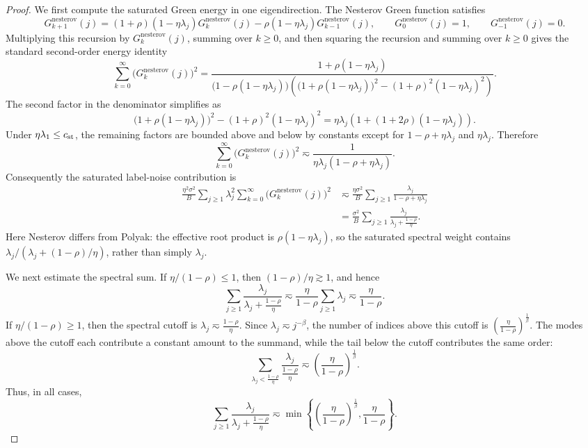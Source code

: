\documentclass[11pt]{article}
\newcommand{\nesterov}{\mathrm{nesterov}}
\begin{document}
\begin{proof}
We first compute the saturated Green energy in one eigendirection.  The Nesterov Green function satisfies
\[
    G_{k+1}^{\nesterov}(j)
    =
    (1+\rho)(1-\eta\lambda_j)G_k^{\nesterov}(j)
    -\rho(1-\eta\lambda_j)G_{k-1}^{\nesterov}(j),
    \qquad
    G_0^{\nesterov}(j)=1,
    \qquad
    G_{-1}^{\nesterov}(j)=0.
\]
Multiplying this recursion by \(G_k^{\nesterov}(j)\), summing over \(k\ge0\), and then squaring the
recursion and summing over \(k\ge0\) gives the standard second-order energy identity
\[
    \sum_{k=0}^{\infty}\bigl(G_k^{\nesterov}(j)\bigr)^2
    =
    \frac{1+\rho(1-\eta\lambda_j)}
    {\bigl(1-\rho(1-\eta\lambda_j)\bigr)
    \left(\bigl(1+\rho(1-\eta\lambda_j)\bigr)^2
    -(1+\rho)^2(1-\eta\lambda_j)^2\right)}.
\]
The second factor in the denominator simplifies as
\[
    \bigl(1+\rho(1-\eta\lambda_j)\bigr)^2
    -(1+\rho)^2(1-\eta\lambda_j)^2
    =
    \eta\lambda_j\left(1+(1+2\rho)(1-\eta\lambda_j)\right).
\]
Under \(\eta\lambda_1\le c_{\rm st}\), the remaining factors are bounded above and below by constants
except for \(1-\rho+\eta\lambda_j\) and \(\eta\lambda_j\).  Therefore
\[
    \sum_{k=0}^{\infty}\bigl(G_k^{\nesterov}(j)\bigr)^2
    \eqsim
    \frac{1}{\eta\lambda_j(1-\rho+\eta\lambda_j)}.
\]
Consequently the saturated label-noise contribution is
\[
\begin{aligned}
    \frac{\eta^2\sigma^2}{B}
    \sum_{j\ge1}\lambda_j^2
    \sum_{k=0}^{\infty}\bigl(G_k^{\nesterov}(j)\bigr)^2
    &\eqsim
    \frac{\eta\sigma^2}{B}
    \sum_{j\ge1}\frac{\lambda_j}{1-\rho+\eta\lambda_j}  \\
    &=
    \frac{\sigma^2}{B}
    \sum_{j\ge1}
    \frac{\lambda_j}{\lambda_j+\frac{1-\rho}{\eta}} .
\end{aligned}
\]
Here Nesterov differs from Polyak: the effective
root product is \(\rho(1-\eta\lambda_j)\), so the saturated spectral weight contains
\(\lambda_j/(\lambda_j+(1-\rho)/\eta)\), rather than simply \(\lambda_j\).

We next estimate the spectral sum.  If \(\eta/(1-\rho)\le1\), then \((1-\rho)/\eta\gtrsim1\), and hence
\[
    \sum_{j\ge1}
    \frac{\lambda_j}{\lambda_j+\frac{1-\rho}{\eta}}
    \eqsim
    \frac{\eta}{1-\rho}\sum_{j\ge1}\lambda_j
    \eqsim
    \frac{\eta}{1-\rho}.
\]
If \(\eta/(1-\rho)\ge1\), then the spectral cutoff is
$\lambda_j\eqsim\frac{1-\rho}{\eta}.$
Since \(\lambda_j\eqsim j^{-\beta}\), the number of indices above this cutoff is
$\left(\frac{\eta}{1-\rho}\right)^{\frac1\beta}.$
The modes above the cutoff each contribute a constant amount to the summand, while the tail below the
cutoff contributes the same order:
\[
    \sum_{\lambda_j<\frac{1-\rho}{\eta}}
    \frac{\lambda_j}{\frac{1-\rho}{\eta}}
    \eqsim
    \left(\frac{\eta}{1-\rho}\right)^{\frac1\beta}.
\]
Thus, in all cases,
\[
    \sum_{j\ge1}
    \frac{\lambda_j}{\lambda_j+\frac{1-\rho}{\eta}}
    \eqsim
    \min\left\{
        \left(\frac{\eta}{1-\rho}\right)^{\frac1\beta},
        \frac{\eta}{1-\rho}
    \right\}.
\]


\end{proof}
\end{document}
